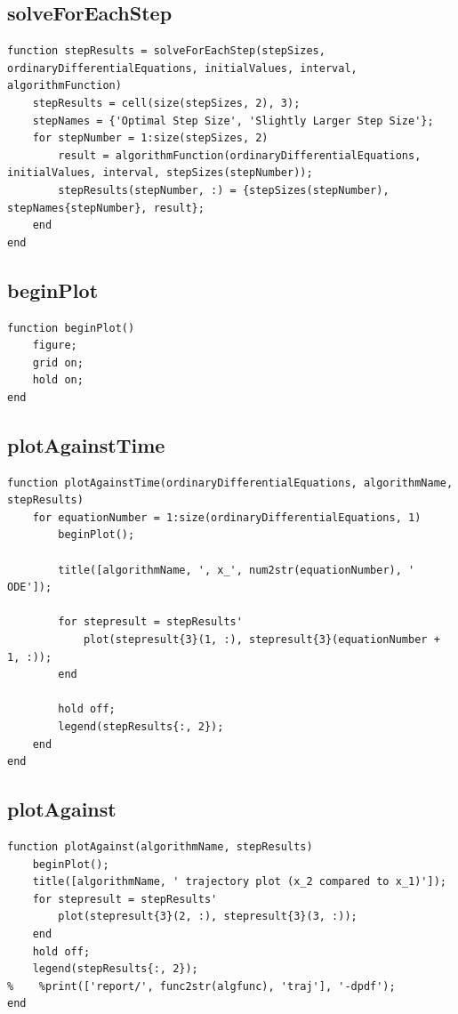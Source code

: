 \subsection{solveForEachStep}
\begin{simplechar}
\begin{lstlisting}
function stepResults = solveForEachStep(stepSizes, ordinaryDifferentialEquations, initialValues, interval, algorithmFunction)
    stepResults = cell(size(stepSizes, 2), 3);
    stepNames = {'Optimal Step Size', 'Slightly Larger Step Size'};
    for stepNumber = 1:size(stepSizes, 2)
        result = algorithmFunction(ordinaryDifferentialEquations, initialValues, interval, stepSizes(stepNumber));
        stepResults(stepNumber, :) = {stepSizes(stepNumber), stepNames{stepNumber}, result};
    end
end
\end{lstlisting}
\end{simplechar}

\subsection{beginPlot}
\begin{simplechar}
\begin{lstlisting}
function beginPlot()
    figure;
    grid on;
    hold on;
end
\end{lstlisting}
\end{simplechar}

\subsection{plotAgainstTime}
\begin{simplechar}
\begin{lstlisting}
function plotAgainstTime(ordinaryDifferentialEquations, algorithmName, stepResults)
    for equationNumber = 1:size(ordinaryDifferentialEquations, 1)
        beginPlot();

        title([algorithmName, ', x_', num2str(equationNumber), ' ODE']);

        for stepresult = stepResults'
            plot(stepresult{3}(1, :), stepresult{3}(equationNumber + 1, :));
        end

        hold off;
        legend(stepResults{:, 2});
    end
end
\end{lstlisting}
\end{simplechar}

\subsection{plotAgainst}
\begin{simplechar}
\begin{lstlisting}
function plotAgainst(algorithmName, stepResults)
    beginPlot();
    title([algorithmName, ' trajectory plot (x_2 compared to x_1)']);
    for stepresult = stepResults'
        plot(stepresult{3}(2, :), stepresult{3}(3, :));
    end
    hold off;
    legend(stepResults{:, 2});
%    %print(['report/', func2str(algfunc), 'traj'], '-dpdf');
end
\end{lstlisting}
\end{simplechar}

